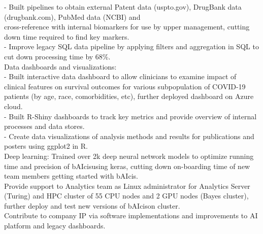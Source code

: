 \documentclass[a4paper]{article}
\newcommand{\mybullet}{
	\indent 
  \textbullet \hspace*{2mm}
}
\newcommand{\mysubbullet}{
	\indent 
  - \hspace*{2mm}
}
\begin{document}
  \mysubbullet Built pipelines to obtain external Patent data (uspto.gov), DrugBank data (drugbank.com), PubMed data (NCBI) and \\\hspace*{10mm}cross-reference with internal biomarkers for use by upper management, cutting down time required to find key markers. \\
  \mysubbullet Improve legacy SQL data pipeline by applying filters and aggregation in SQL to cut down processing time by 68\%. \\
  \mybullet Data dashboards and visualizations: \\ 
  \mysubbullet Built interactive data dashboard to allow clinicians to examine impact of clinical features on survival outcomes for various \hspace*{10mm}subpopulation of COVID-19 patients (by age, race, comorbidities, etc), further deployed dashboard on Azure cloud. \\
  \mysubbullet Built R-Shiny dashboards to track key metrics and provide overview of internal processes and data stores. \\
  \mysubbullet Create data visualizations of analysis methods and results for publications and posters using ggplot2 in R. \\
  \mybullet Deep learning: Trained over 2k deep neural network models to optimize running time and precision of bAIcis\textregistered using keras, \hspace*{10mm}cutting down on-boarding time of new team members getting started with bAIcis\textregistered. \\
  \mybullet Provide support to Analytics team as Linux administrator for Analytics Server (Turing) and HPC cluster of 55 CPU nodes \hspace*{10mm}and 2 GPU nodes (Bayes cluster), further deploy and test new versions of bAIcis\textregistered on cluster. \\
  \mybullet Contribute to company IP via software implementations and improvements to AI platform and legacy dashboards. \\
\end{document}
